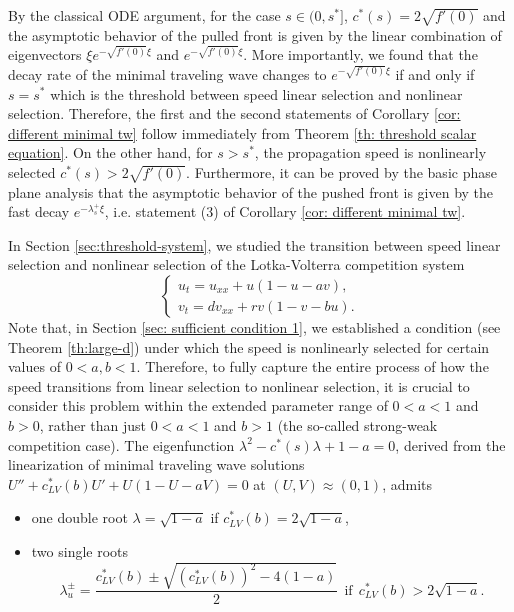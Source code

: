 \documentclass[11pt,a4paper]{article}
\numberwithin{equation}{section}
\numberwithin{figure}{section}
\begin{document}
By the classical ODE argument, for the case $s\in (0,s^*]$, $c^*(s)=2\sqrt{f'(0)}$ and the asymptotic behavior of the pulled front is given by the linear combination of eigenvectors $\xi e^{-\sqrt{f'(0)}\xi}$ and  $e^{-\sqrt{f'(0)}\xi}$. More importantly, we found that the decay rate of the minimal traveling wave changes to $e^{-\sqrt{f'(0)}\xi}$ if and only if $s=s^*$ which is the threshold between speed linear selection and nonlinear selection. Therefore, the first and the second statements of Corollary \ref{cor: different minimal tw} follow immediately from Theorem \ref{th: threshold scalar equation}. On the other hand, for $s>s^*$, the propagation speed is nonlinearly selected $c^*(s)>2\sqrt{f'(0)}$. Furthermore, it can be proved by the basic phase plane analysis that the asymptotic behavior of the pushed front is given by the fast decay $e^{-\lambda_s^+\xi}$, i.e. statement (3) of Corollary \ref{cor: different minimal tw}.

In Section \ref{sec:threshold-system}, we studied the transition between speed linear selection and nonlinear selection of the Lotka-Volterra competition system
\begin{equation*}
\left\{
\begin{aligned}
u_t=u_{xx}+u(1-u-av),\\
v_t=dv_{xx}+rv(1-v-bu).
\end{aligned}
\right.
\end{equation*}
Note that,  in Section \ref{sec: sufficient condition 1}, we established a condition (see Theorem \ref{th:large-d}) under which the speed is nonlinearly selected for certain values of $0<a,b<1$. Therefore, to fully capture the entire process of how the speed transitions from linear selection to nonlinear selection, it is crucial to consider this problem within the extended parameter range of $0<a<1$ and $b>0$, rather than just $0<a<1$ and $b>1$ (the so-called strong-weak competition case).  The eigenfunction $\lambda^2-c^*(s)\lambda+1-a=0$, derived from the linearization of minimal traveling wave solutions
$U''+c_{LV}^*(b)U'+U(1-U-aV)=0$ at $(U,V)\approx (0,1)$, admits 
\begin{itemize}
\item one double root $\lambda=\sqrt{1-a}$ if $c^*_{LV}(b)=2\sqrt{1-a}$, 
\item two single roots 
$$\lambda_u^{\pm}=\frac{c_{LV}^*(b)\pm\sqrt{(c^*_{LV}(b))^2-4(1-a)}}{2}\ \ \text{if}\ \ c_{LV}^*(b)>2\sqrt{1-a}.$$ 
\end{itemize}
\end{document}
